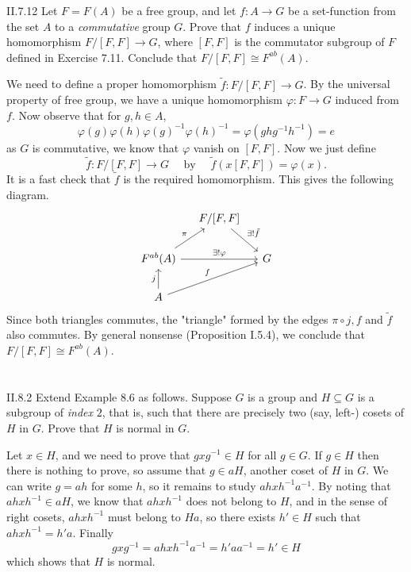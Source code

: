 \begin{problem}{II.7.12}
Let $F=F(A)$ be a free group, and let $f:A \to G$ be a set-function from the set $A$ to a \emph{commutative} group $G$. Prove that $f$ induces a unique homomorphism $F/[F,F] \to G$, where $[F,F]$ is the commutator subgroup of $F$ defined in Exercise 7.11. Conclude that $F/[F,F] \cong F^{ab}(A)$.	
\end{problem}
\begin{pf}
We need to define a proper homomorphism $\tilde{f} : F/[F,F] \to G$. By the universal property of free group, we have a unique homomorphism $\varphi : F \to G$ induced from $f$. Now observe that for $g,h \in A$, 
$$
\varphi(g)\varphi(h)\varphi(g)^{-1}\varphi(h)^{-1} = \varphi(ghg^{-1}h^{-1}) = e
$$
as $G$ is commutative, we know that $\varphi$ vanish on $[F,F]$. Now we just define
$$
\tilde{f} : F/[F,F] \to G \quad \text{ by } \quad \tilde{f}(x[F,F]) = \varphi(x).
$$
It is a fast check that $\tilde{f}$ is the required homomorphism. This gives the following diagram.
\[
\begin{tikzcd}[column sep=small]
& {F/[F,F]} \arrow[rd, "\exists ! \tilde{f}"] &   \\
F^{ab}(A) \arrow[ru, "\pi"] \arrow[rr, "\exists ! \varphi"] &                                             & G \\
A \arrow[rru, "f"] \arrow[u, "j"]                           &                                             &  
\end{tikzcd}	
\]
Since both triangles commutes, the "triangle" formed by the edges $\pi \circ j, f$ and $\tilde{f}$ also commutes. By general nonsense (Proposition I.5.4), we conclude that $F/[F,F] \cong F^{ab}(A)$.
\end{pf}

\section{}

\begin{problem}{II.8.2}
Extend Example 8.6 as follows. Suppose $G$ is a group and $H \subseteq G$ is a subgroup of \emph{index} $2$, that is, such that there are precisely two (say, left-) cosets of $H$ in $G$. Prove that $H$ is normal in $G$.
\end{problem}
\begin{pf}
Let $x \in H$, and we need to prove that $gxg^{-1} \in H$ for all $g \in G$. If $g \in H$ then there is nothing to prove, so assume that $g \in aH$, another coset of $H$ in $G$. We can write $g = ah$ for some $h$, so it remains to study $ahxh^{-1}a^{-1}$. By noting that $ahxh^{-1} \in aH$, we know that $ahxh^{-1}$ does not belong to $H$, and in the sense of right cosets, $ahxh^{-1}$ must belong to $Ha$, so there exists $h' \in H$ such that $ahxh^{-1} = h'a$. Finally
\[
gxg^{-1} = ahxh^{-1}a^{-1} = h'aa^{-1} = h' \in H	
\]
which shows that $H$ is normal.
\end{pf}

